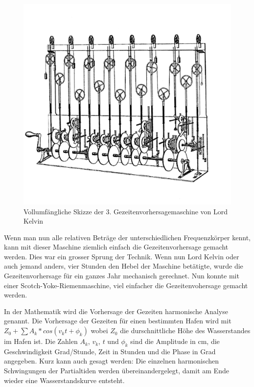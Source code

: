 \begin{figure}
	\centering
	\includegraphics[width=\linewidth]{"papers/gezeiten/Thompson Skizze"}
	\caption{Vollumfängliche Skizze der 3. Gezeitenvorhersagemaschine von Lord Kelvin}
	\label{fig:thompson-skizze}
\end{figure}

Wenn man nun alle relativen Beträge der unterschiedlichen Frequenzkörper kennt, kann mit dieser Maschine ziemlich einfach die Gezeitenvorhersage gemacht werden.
Dies war ein grosser Sprung der Technik.
Wenn nun Lord Kelvin oder auch jemand anders, vier Stunden den Hebel der Maschine betätigte, wurde die Gezeitenvorhersage für ein ganzes Jahr mechanisch gerechnet.
Nun konnte mit einer Scotch-Yoke-Riemenmaschine, viel einfacher die Gezeitenvohersage gemacht werden.

In der Mathematik wird die Vorhersage der Gezeiten harmonische Analyse genannt.
Die Vorhersage der Gezeiten für einen bestimmten Hafen wird mit $Z_0+\sum A_k*cos(v_kt+\phi_k)$ wobei $Z_0$ die durschnittliche Höhe des Wasserstandes im Hafen ist. Die Zahlen $A_k$, $v_k$, $t$ und $\phi_k$ sind die Amplitude in cm, die Geschwindigkeit Grad/Stunde, Zeit in Stunden und die Phase in Grad angegeben.
Kurz kann auch gesagt werden: Die einzelnen harmonischen Schwingungen der Partialtiden werden übereinandergelegt, damit am Ende wieder eine Wasserstandskurve entsteht.

